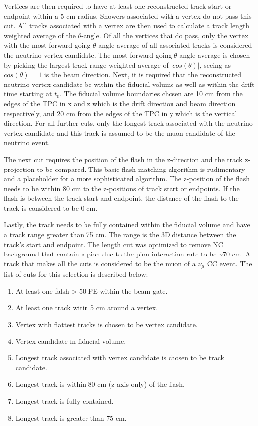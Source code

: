 Vertices are then required to have at least one reconstructed track start or endpoint within a 5 cm radius. Showers associated with a vertex do not pass this cut. All tracks associated with a vertex are then used to calculate a track length weighted average of the $\theta$-angle. Of all the vertices that do pass, only the vertex with the most forward going $\theta$-angle average of all associated tracks is considered the neutrino vertex candidate. The most forward going $\theta$-angle average is chosen by picking the largest track range weighted average of $|cos(\theta)|$, seeing as $cos(\theta)=1$ is the beam direction. Next, it is required that the reconstructed neutrino vertex candidate be within the fiducial volume as well as within the drift time starting at $t_0$. The fiducial volume boundaries chosen are 10 cm from the edges of the TPC in x and z which is the drift direction and beam direction respectively, and 20 cm from the edges of the TPC in y which is the vertical direction. For all further cuts, only the longest track associated with the neutrino vertex candidate and this track is assumed to be the muon candidate of the neutrino event.

The next cut requires the position of the flash in the z-direction and the track z-projection to be compared. This basic flash matching algorithm is rudimentary and a placeholder for a more sophisticated algorithm. The z-position of the flash needs to be within 80 cm to the z-positions of track start or endpoints. If the flash is between the track start and endpoint, the distance of the flash to the track is considered to be 0 cm. 

Lastly, the track needs to be fully contained within the fiducial volume and have a track range greater than 75 cm. The range is the 3D distance between the track's start and endpoint. The length cut was optimized to remove NC background that contain a pion due to the pion interaction rate to be \sim 70 cm. A track that makes all the cuts is considered to be the muon of a $\nu_{\mu}$ CC event. The list of cuts for this selection is described below:
\begin{enumerate}
\item At least one falsh > 50 PE within the beam gate.
\item At least one track witin 5 cm around a vertex.
\item Vertex with flattest tracks is chosen to be vertex candidate.
\item Vertex candidate in fiducial volume.
\item Longest track associated with vertex candidate is chosen to be track candidate.
\item Longest track is within 80 cm (z-axis only) of the flash.
\item Longest track is fully contained.
\item Longest track is greater than 75 cm.
\end{enumerate}

